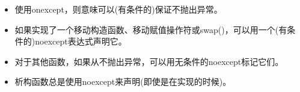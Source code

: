 \begin{itemize}
	\item 使用onexcept，则意味可以(有条件的)保证不抛出异常。
	\item 如果实现了一个移动构造函数、移动赋值操作符或swap()，可以用一个(有条件的)noexcept表达式声明它。
	\item 对于其他函数，如果从不抛出异常，可以用无条件的noexcept标记它们。
	\item 析构函数总是使用noexcept来声明(即使是在实现的时候)。
\end{itemize}


\newpage